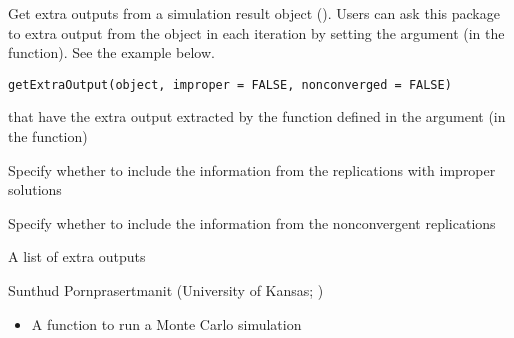 \documentclass[a4paper]{book}
\begin{document}
%
\begin{Description}\relax
Get extra outputs from a simulation result object (). Users can ask this package to extra output from the  object in each iteration by setting the  argument (in the  function). See the example below.
\end{Description}
%
\begin{Usage}
\begin{verbatim}
getExtraOutput(object, improper = FALSE, nonconverged = FALSE)
\end{verbatim}
\end{Usage}
%
\begin{Arguments}
\begin{ldescription}
\item[\code{object}] 
 that have the extra output extracted by the function defined in the  argument (in the  function)

\item[\code{improper}] 
Specify whether to include the information from the replications with improper solutions

\item[\code{nonconverged}] 
Specify whether to include the information from the nonconvergent replications

\end{ldescription}
\end{Arguments}
%
\begin{Value}
A list of extra outputs
\end{Value}
%
\begin{Author}\relax
Sunthud Pornprasertmanit (University of Kansas; )
\end{Author}
%
\begin{SeeAlso}\relax
\begin{itemize}

\item {} A function to run a Monte Carlo simulation

\end{itemize}

\end{SeeAlso}
%
\end{document}
